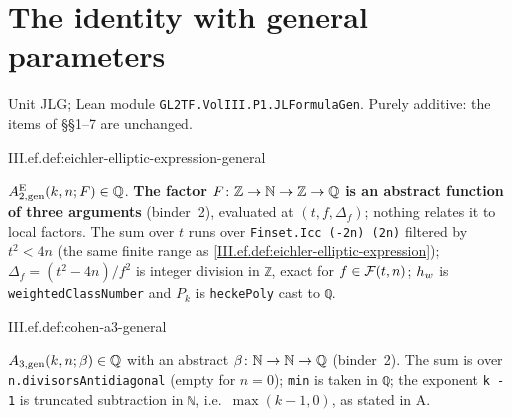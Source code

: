 \section{The identity with general parameters}\label{sec:ef-identity-general}

\noindent Unit JLG; Lean module \texttt{GL2TF.VolIII.P1.JLFormulaGen}. Purely additive: the items of \S\S1--7 are unchanged.

\begin{definition}
\end{definition}
\begin{tfformal}{III.ef.def:eichler-elliptic-expression-general}
\begin{tffidelity}
$A_{2,\mathrm{gen}}^{\mathrm E}(k,n;F)\in\mathbb{Q}$. \textbf{The factor $F\colon\mathbb{Z}\to\mathbb{N}\to\mathbb{Z}\to\mathbb{Q}$ is an abstract function of three arguments} (binder~2), evaluated at $(t,f,\Delta_f)$; nothing relates it to local factors. The sum over $t$ runs over \texttt{Finset.Icc (-2n) (2n)} filtered by $t^2<4n$ (the same finite range as \cref{III.ef.def:eichler-elliptic-expression}); $\Delta_f=(t^2-4n)/f^2$ is integer division in \texttt{ℤ}, exact for $f\in\mathcal{F}(t,n)$; $h_w$ is \texttt{weightedClassNumber} and $P_k$ is \texttt{heckePoly} cast to \texttt{ℚ}.
\end{tffidelity}
\end{tfformal}

\begin{definition}
\end{definition}
\begin{tfformal}{III.ef.def:cohen-a3-general}
\begin{tffidelity}
$A_{3,\mathrm{gen}}(k,n;\beta)\in\mathbb{Q}$ with an abstract $\beta\colon\mathbb{N}\to\mathbb{N}\to\mathbb{Q}$ (binder~2). The sum is over \texttt{n.divisorsAntidiagonal} (empty for $n=0$); \texttt{min} is taken in \texttt{ℚ}; the exponent \texttt{k - 1} is truncated subtraction in \texttt{ℕ}, i.e.\ $\max(k-1,0)$, as stated in A.
\end{tffidelity}
\end{tfformal}

